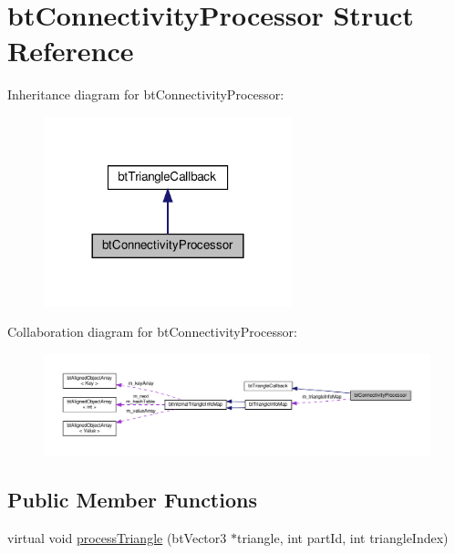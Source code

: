\hypertarget{structbtConnectivityProcessor}{}\section{bt\+Connectivity\+Processor Struct Reference}
\label{structbtConnectivityProcessor}


Inheritance diagram for bt\+Connectivity\+Processor\+:
\nopagebreak
\begin{figure}[H]
\begin{center}
\leavevmode
\includegraphics[width=204pt]{structbtConnectivityProcessor__inherit__graph}
\end{center}
\end{figure}


Collaboration diagram for bt\+Connectivity\+Processor\+:
\nopagebreak
\begin{figure}[H]
\begin{center}
\leavevmode
\includegraphics[width=350pt]{structbtConnectivityProcessor__coll__graph}
\end{center}
\end{figure}
\subsection*{Public Member Functions}
\begin{DoxyCompactItemize}
\item 
virtual void \hyperlink{structbtConnectivityProcessor_a5d5f11a5ad2bc3b3bfad6882b42e18de}{process\+Triangle} (bt\+Vector3 $\ast$triangle, int part\+Id, int triangle\+Index)
\end{DoxyCompactItemize}
